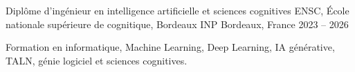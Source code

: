 
\begin{cventries}
  \cventry
    {Diplôme d’ingénieur en intelligence artificielle et sciences cognitives}
    {ENSC, École nationale supérieure de cognitique, Bordeaux INP}
    {Bordeaux, France}
    {2023 -- 2026}
    {
      \begin{cvitems}
        \item {Formation en informatique, Machine Learning, Deep Learning, IA générative, TALN, génie logiciel et sciences cognitives.}
      \end{cvitems}
    }
\end{cventries}
